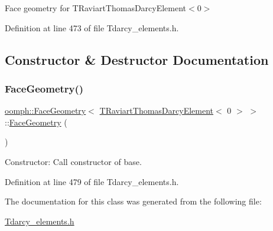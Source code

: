 Face geometry for T\+Raviart\+Thomas\+Darcy\+Element$<$0$>$ 

Definition at line 473 of file Tdarcy\+\_\+elements.\+h.



\subsection{Constructor \& Destructor Documentation}
\mbox{\label{classoomph_1_1FaceGeometry_3_01TRaviartThomasDarcyElement_3_010_01_4_01_4_ab845123757e35e20beae812a46340c25}} 
\subsubsection{\texorpdfstring{Face\+Geometry()}{FaceGeometry()}}
{\footnotesize\ttfamily \hyperlink{classoomph_1_1FaceGeometry}{oomph\+::\+Face\+Geometry}$<$ \hyperlink{classoomph_1_1TRaviartThomasDarcyElement}{T\+Raviart\+Thomas\+Darcy\+Element}$<$ 0 $>$ $>$\+::\hyperlink{classoomph_1_1FaceGeometry}{Face\+Geometry} (\begin{DoxyParamCaption}{ }\end{DoxyParamCaption})\hspace{0.3cm}{\ttfamily [inline]}}



Constructor\+: Call constructor of base. 



Definition at line 479 of file Tdarcy\+\_\+elements.\+h.



The documentation for this class was generated from the following file\+:\begin{DoxyCompactItemize}
\item 
\hyperlink{Tdarcy__elements_8h}{Tdarcy\+\_\+elements.\+h}\end{DoxyCompactItemize}
